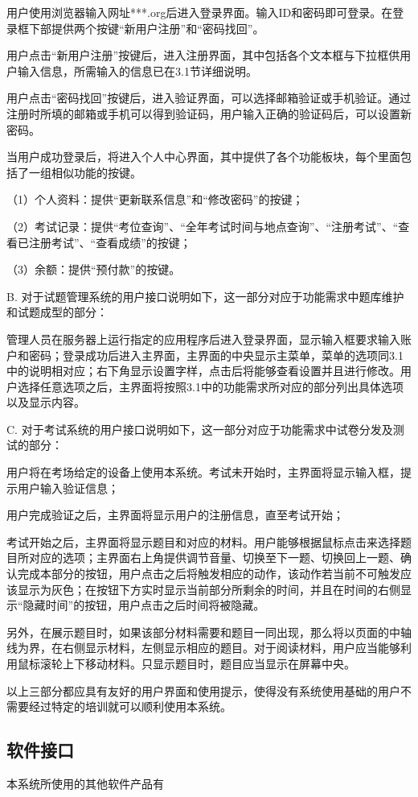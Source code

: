 用户使用浏览器输入网址***.org后进入登录界面。输入ID和密码即可登录。在登录框下部提供两个按键“新用户注册”和“密码找回”。

用户点击“新用户注册”按键后，进入注册界面，其中包括各个文本框与下拉框供用户输入信息，所需输入的信息已在3.1节详细说明。

用户点击“密码找回”按键后，进入验证界面，可以选择邮箱验证或手机验证。通过注册时所填的邮箱或手机可以得到验证码，用户输入正确的验证码后，可以设置新密码。

当用户成功登录后，将进入个人中心界面，其中提供了各个功能板块，每个里面包括了一组相似功能的按键。

（1）个人资料：提供“更新联系信息”和“修改密码”的按键；
	
（2）考试记录：提供“考位查询”、“全年考试时间与地点查询”、“注册考试”、“查看已注册考试”、“查看成绩”的按键；

（3）余额：提供“预付款”的按键。

B. 对于试题管理系统的用户接口说明如下，这一部分对应于功能需求中题库维护和试题成型的部分：

管理人员在服务器上运行指定的应用程序后进入登录界面，显示输入框要求输入账户和密码；登录成功后进入主界面，主界面的中央显示主菜单，菜单的选项同3.1中的说明相对应；右下角显示设置字样，点击后将能够查看设置并且进行修改。用户选择任意选项之后，主界面将按照3.1中的功能需求所对应的部分列出具体选项以及显示内容。

C. 对于考试系统的用户接口说明如下，这一部分对应于功能需求中试卷分发及测试的部分：

用户将在考场给定的设备上使用本系统。考试未开始时，主界面将显示输入框，提示用户输入验证信息；

用户完成验证之后，主界面将显示用户的注册信息，直至考试开始；

考试开始之后，主界面将显示题目和对应的材料。用户能够根据鼠标点击来选择题目所对应的选项；主界面右上角提供调节音量、切换至下一题、切换回上一题、确认完成本部分的按钮，用户点击之后将触发相应的动作，该动作若当前不可触发应该显示为灰色；在按钮下方实时显示当前部分所剩余的时间，并且在时间的右侧显示“隐藏时间”的按钮，用户点击之后时间将被隐藏。

另外，在展示题目时，如果该部分材料需要和题目一同出现，那么将以页面的中轴线为界，在右侧显示材料，左侧显示相应的题目。对于阅读材料，用户应当能够利用鼠标滚轮上下移动材料。只显示题目时，题目应当显示在屏幕中央。

以上三部分都应具有友好的用户界面和使用提示，使得没有系统使用基础的用户不需要经过特定的培训就可以顺利使用本系统。

\subsection{软件接口}
本系统所使用的其他软件产品有


